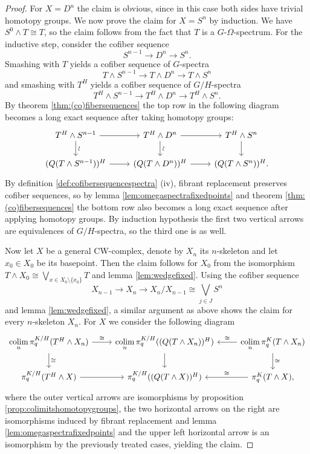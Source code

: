 \begin{proof}
For $X=D^n$ the claim is obvious, since in this case both sides have trivial homotopy groups. 
We now prove the claim  for $X=S^n$ by
induction. We have $S^0\wedge T\cong T$, so the claim follows 
from the fact that $T$ is a $G$-$\Omega$-spectrum. For the inductive step, consider the cofiber sequence
$$S^{n-1}\rightarrow D^n\rightarrow S^n.$$
Smashing with $T$ yields a cofiber sequence of $G$-spectra
$$T\wedge S^{n-1}\rightarrow T\wedge D^n\rightarrow T\wedge S^n$$
and smashing with $T^H$ yields a cofiber sequence of $G/H$-spectra
\[
T^H\wedge S^{n-1}\rightarrow T^H\wedge D^n\rightarrow T^H\wedge S^n.
\]
By theorem \ref{thm:(co)fibersequences} the top row in the following diagram
becomes a long exact sequence after taking homotopy groups:
$$
\begin{tikzcd}
\arrow{r} \arrow{d}[anchor = center, rotate = 90, yshift = -1ex]{\sim}
T^H\wedge S^{n-1}
&T^H\wedge D^{n}
\arrow{r} \arrow{d}[anchor = center, rotate = 90, yshift = -1ex]{\sim}
&T^H\wedge S^{n}
\arrow{d}
\\
(Q(T\wedge S^{n-1}))^H\arrow{r}
&(Q(T\wedge D^n))^H\arrow{r}
&(Q(T\wedge S^{n}))^H.
\end{tikzcd}
$$
By definition \ref{def:cofibersequencespectra} (iv), fibrant replacement preserves cofiber sequences, so by lemma \ref{lem:omegaspectrafixedpoints}
and theorem \ref{thm:(co)fibersequences}
the bottom row also becomes a long exact sequence after applying homotopy groups.
By induction hypothesis the first two
vertical arrows are equivalences of $G/H$-spectra, so the third one is as well.

Now let $X$ be a general CW-complex, denote by $X_n$ its $n$-skeleton and let  $x_0\in X_0$ be its basepoint.
Then the claim follows for $X_0$ from the isomorphism $T\wedge X_0\cong \bigvee_{x\in X_0\setminus\{x_0\}} T$ and lemma \ref{lem:wedgefixed}. Using the cofiber sequence
\[X_{n-1}\to X_n\to X_n/X_{n-1}\cong\bigvee_{j\in J} S^n\]
and lemma \ref{lem:wedgefixed}, a similar argument as above shows the claim for every
$n$-skeleton $X_n$. For $X$ we consider the following diagram
\[
\begin{tikzcd}
\underset{n}{\colim}\,\pi_q^{K/H}(T^H \wedge X_n)
\arrow{d}{\cong}\arrow{r}{\cong}
& \underset{n}{\colim}\,\pi_q^{K/H}((Q(T \wedge X_n))^H)
\arrow{d}
&\underset{n}{\colim}\,\pi_q^{K}(T \wedge X_n)
\arrow[swap]{l}{\cong}\arrow{d}{\cong}\\
\pi_q^{K/H}(T^H \wedge X)
\arrow{r}
&\pi_q^{K/H}((Q(T \wedge X))^H)
& \pi_q^{K}(T \wedge X)
\arrow[swap]{l}{\cong},
\end{tikzcd}
\]
where the outer vertical arrows are isomorphisms by proposition \ref{prop:colimitshomotopygroups},
the two horizontal arrows on the right are isomorphisms induced by fibrant replacement and lemma
\ref{lem:omegaspectrafixedpoints} and the upper left horizontal arrow is an isomorphism
by the previously treated cases, yielding the claim. 
\end{proof}


